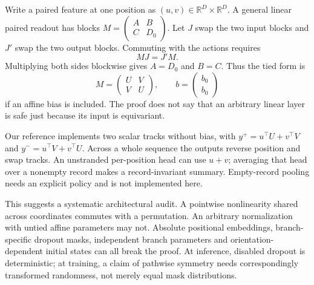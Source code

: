 Write a paired feature at one position as $(u,v)\in\mathbb R^D\times\mathbb R^D$.
A general linear paired readout has blocks
$M=\left(\begin{smallmatrix}A&B\\C&D_0\end{smallmatrix}\right)$.
Let $J$ swap the two input blocks and $J'$ swap the two output blocks.
Commuting with the actions requires
\begin{equation}
 MJ=J'M .
\end{equation}
Multiplying both sides blockwise gives $A=D_0$ and $B=C$. Thus the tied form is
\begin{equation}
 M=\begin{pmatrix}U&V\\V&U\end{pmatrix},
 \qquad b=\begin{pmatrix}b_0\\b_0\end{pmatrix}
 \label{eq:tied}
\end{equation}
if an affine bias is included. The proof does not say that an arbitrary
linear layer is safe just because its input is equivariant.



Our reference implements two scalar tracks without bias, with
$y^+=u^\top U+v^\top V$ and $y^-=u^\top V+v^\top U$.
Across a whole sequence the outputs reverse position and swap tracks.
An unstranded per-position head can use $u+v$; averaging that head over a
nonempty record makes a record-invariant summary. Empty-record pooling needs
an explicit policy and is not implemented here.

This suggests a systematic architectural audit. A pointwise nonlinearity
shared across coordinates commutes with a permutation. An arbitrary
normalization with untied affine parameters may not. Absolute positional
embeddings, branch-specific dropout masks, independent branch parameters and
orientation-dependent initial states can all break the proof. At inference,
disabled dropout is deterministic; at training, a claim of pathwise symmetry
needs correspondingly transformed randomness, not merely equal mask
distributions.

